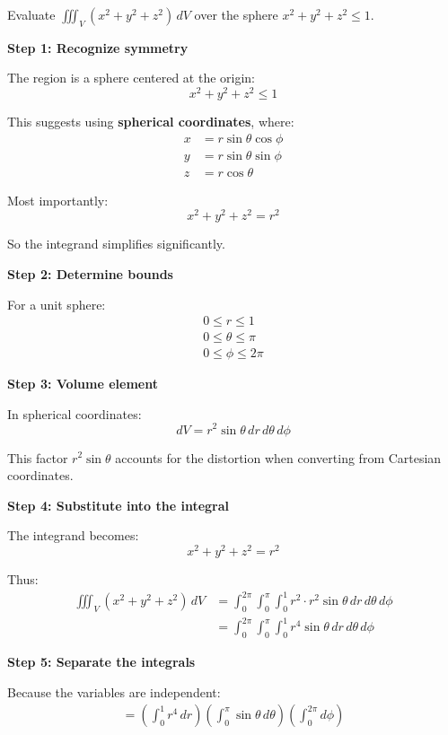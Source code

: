 \begin{examplebox}
    Evaluate $\iiint_V (x^2+y^2+z^2)\, dV$ over the sphere $x^2+y^2+z^2\le1$.

    \textbf{Step 1: Recognize symmetry}

    The region is a sphere centered at the origin:
    \[
        x^2+y^2+z^2 \le 1
    \]

    This suggests using \textbf{spherical coordinates}, where:
    \begin{align*}
        x & = r\sin\theta\cos\phi \\
        y & = r\sin\theta\sin\phi \\
        z & = r\cos\theta
    \end{align*}

    Most importantly:
    \[
        x^2+y^2+z^2 = r^2
    \]

    So the integrand simplifies significantly.

    \textbf{Step 2: Determine bounds}

    For a unit sphere:
    \begin{align*}
        0 \le r \le 1        \\
        0 \le \theta \le \pi \\
        0 \le \phi \le 2\pi
    \end{align*}

    \textbf{Step 3: Volume element}

    In spherical coordinates:
    \begin{equation*}
        dV = r^2\sin\theta\,dr\,d\theta\,d\phi
    \end{equation*}

    This factor $r^2\sin\theta$ accounts for the distortion when converting from Cartesian coordinates.

    \textbf{Step 4: Substitute into the integral}

    The integrand becomes:
    \[
        x^2+y^2+z^2 = r^2
    \]

    Thus:
    \begin{align*}
        \iiint_V (x^2+y^2+z^2)\, dV
         & = \int_0^{2\pi}\int_0^\pi\int_0^1 r^2 \cdot r^2\sin\theta\,dr\,d\theta\,d\phi \\
         & = \int_0^{2\pi}\int_0^\pi\int_0^1 r^4\sin\theta\,dr\,d\theta\,d\phi
    \end{align*}

    \textbf{Step 5: Separate the integrals}

    Because the variables are independent:
    \begin{align*}
        = \left(\int_0^1 r^4\,dr\right)
        \left(\int_0^\pi \sin\theta\,d\theta\right)
        \left(\int_0^{2\pi} d\phi\right)
    \end{align*}


\end{examplebox}
